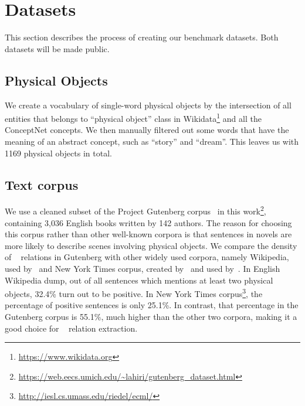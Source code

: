 \section{Datasets}
\label{sec:data}

This section describes the process of creating our benchmark datasets.
Both datasets will be made public.

\subsection{Physical Objects}
We create a vocabulary of single-word physical objects by the 
intersection of all entities that belongs to ``physical object'' class
in Wikidata\footnote{\url{https://www.wikidata.org}} and 
all the ConceptNet concepts. We then manually filtered out some 
words that have the meaning of an abstract concept, 
such as ``story'' and ``dream''. This leaves us with
1169 physical objects in total.

\subsection{Text corpus}
We use a cleaned subset of the Project Gutenberg corpus~\cite{lahiri:2014:SRW} 
in this work\footnote{\url{https://web.eecs.umich.edu/~lahiri/gutenberg_dataset.html}}, containing 3,036 English books written by 142 authors.
The reason for choosing this corpus rather than other well-known
corpora is that sentences in novels are more likely to describe scenes 
involving physical objects. 
We compare the density of \lnear~ relations in Gutenberg with other 
widely used corpora, namely Wikipedia, 
used by~\cite{mintz2009distant} and New York Times corpus, 
created by~\cite{riedel2010modeling} and 
used by~\cite{Lin2016NeuralRE,hoffmann2011knowledge,surdeanu2012multi}. 
In English Wikipedia dump, out of all sentences which mentions at least two
physical objects, 32.4\% turn out to be positive. 
In New York Times corpus\footnote{\url{http://iesl.cs.umass.edu/riedel/ecml/}},
the percentage of positive sentences is only 25.1\%. 
In contrast, that percentage in the Gutenberg corpus is 55.1\%, much higher 
than the other two corpora, making it a good choice for \lnear~ 
relation extraction.

